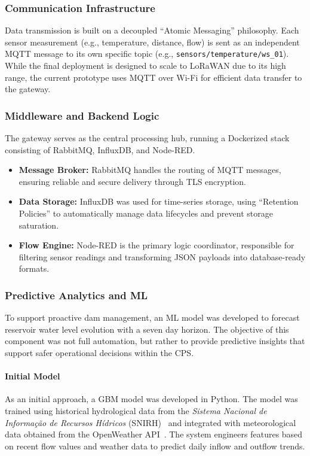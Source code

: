 \subsubsection{Communication Infrastructure}
Data transmission is built on a decoupled ``Atomic Messaging'' philosophy. Each sensor measurement (e.g., temperature, distance, flow) is sent as an independent MQTT message to its own specific topic (e.g., \texttt{sensors/temperature/ws\_01}). While the final deployment is designed to scale to LoRaWAN due to its high range, the current prototype uses MQTT over Wi-Fi for efficient data transfer to the gateway.

\subsubsection{Middleware and Backend Logic}
The gateway serves as the central processing hub, running a Dockerized stack consisting of RabbitMQ, InfluxDB, and Node-RED.
\begin{itemize}
    \item \textbf{Message Broker:} RabbitMQ handles the routing of MQTT messages, ensuring reliable and secure delivery through TLS encryption.
    \item \textbf{Data Storage:} InfluxDB was used for time-series storage, using ``Retention Policies'' to automatically manage data lifecycles and prevent storage saturation.
    \item \textbf{Flow Engine:} Node-RED is the primary logic coordinator, responsible for filtering sensor readings and transforming JSON payloads into database-ready formats.
\end{itemize}

\subsubsection{Predictive Analytics and ML}

To support proactive dam management, an ML model was developed to forecast reservoir water level evolution with a seven day horizon. The objective of this component was not full automation, but rather to provide predictive insights that support safer operational decisions within the CPS.

\paragraph{Initial Model}
As an initial approach, a GBM model was developed in Python. The model was trained using historical hydrological data from the \textit{Sistema Nacional de Informação de Recursos Hídricos} (SNIRH)~\cite{snirh} and integrated with meteorological data obtained from the OpenWeather API~\cite{openweather}. The system engineers features based on recent flow values and weather data to predict daily inflow and outflow trends.

